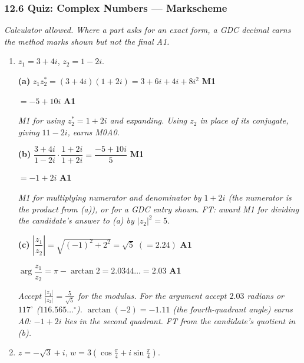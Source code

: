 \documentclass[12pt, twoside]{article}
\begin{document}
\subsubsection*{12.6 Quiz: Complex Numbers --- Markscheme}

\emph{Calculator allowed. Where a part asks for an exact form, a GDC
decimal earns the method marks shown but not the final A1.}

\begin{enumerate}[itemsep=0.3cm]

\item[1.] [Maximum mark: 6]

$z_{1} = 3 + 4i$, \quad $z_{2} = 1 - 2i$.

\textbf{(a)} $z_{1}z_{2}^{*} = (3 + 4i)(1 + 2i) = 3 + 6i + 4i + 8i^{2}$
\hfill \textbf{M1}

$= -5 + 10i$ \hfill \textbf{A1}

\emph{M1 for using $z_{2}^{*} = 1 + 2i$ and expanding. Using $z_{2}$ in
place of its conjugate, giving $11 - 2i$, earns M0A0.}

\textbf{(b)} $\dfrac{3 + 4i}{1 - 2i} \cdot \dfrac{1 + 2i}{1 + 2i}
= \dfrac{-5 + 10i}{5}$ \hfill \textbf{M1}

$= -1 + 2i$ \hfill \textbf{A1}

\emph{M1 for multiplying numerator and denominator by $1 + 2i$ (the
numerator is the product from (a)), or for a GDC entry shown. FT: award M1
for dividing the candidate's answer to (a) by $|z_{2}|^{2} = 5$.}

\textbf{(c)} $\left|\dfrac{z_{1}}{z_{2}}\right| = \sqrt{(-1)^{2} + 2^{2}}
= \sqrt{5} \; (= 2.24)$ \hfill \textbf{A1}

$\arg\dfrac{z_{1}}{z_{2}} = \pi - \arctan 2 = 2.0344\ldots = 2.03$
\hfill \textbf{A1}

\emph{Accept $\frac{|z_{1}|}{|z_{2}|} = \frac{5}{\sqrt{5}}$ for the
modulus. For the argument accept $2.03$ radians or $117^{\circ}$
($116.565\ldots^{\circ}$). $\arctan(-2) = -1.11$ (the fourth-quadrant
angle) earns A0: $-1 + 2i$ lies in the second quadrant. FT from the
candidate's quotient in (b).}

\newpage

\item[2.] [Maximum mark: 7]

$z = -\sqrt{3} + i$, \quad
$w = 3\left(\cos\frac{\pi}{4} + i\sin\frac{\pi}{4}\right)$.


\end{enumerate}
\end{document}

